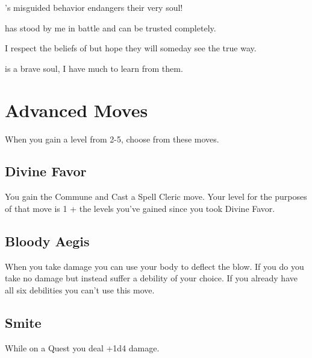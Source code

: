         

\thinrules[n=2]'s misguided behavior endangers their very soul!

         

\thinrules[n=2] has stood by me in battle and can be trusted completely.

         

I respect the beliefs of \thinrules[n=2] but hope they will someday see the true way.

         

\thinrules[n=2] is a brave soul, I have much to learn from them.

       

       
\section{Advanced Moves}    
       

         
\startInstructionsAfterHeader
When you gain a level from 2-5, choose from these moves.
\stopInstructionsAfterHeader
         
\subsection{Divine Favor}    
         

You gain the Commune and Cast a Spell Cleric move. Your level for the purposes of that move is 1 + the levels you've gained since you took Divine Favor.

         
\subsection{Bloody Aegis}    
         

When you take damage you can use your body to deflect the blow. If you do you take no damage but instead suffer a debility of your choice. If you already have all six debilities you can't use this move.

         
\subsection{Smite}   
         

While on a Quest you deal +1d4 damage.

         
